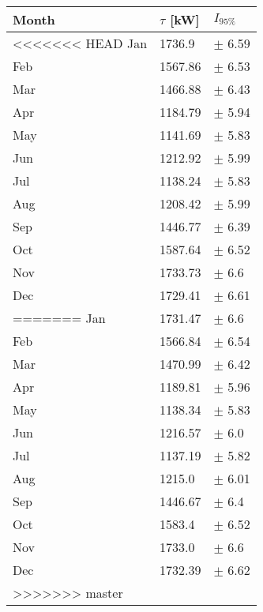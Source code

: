 \begin{tabular}{lll}
\toprule
Month & $\tau$ [kW] &   $I_{95\%}$ \\
\midrule
<<<<<<< HEAD
  Jan &      1736.9 &   $\pm$ 6.59 \\
  Feb &     1567.86 &   $\pm$ 6.53 \\
  Mar &     1466.88 &   $\pm$ 6.43 \\
  Apr &     1184.79 &   $\pm$ 5.94 \\
  May &     1141.69 &   $\pm$ 5.83 \\
  Jun &     1212.92 &   $\pm$ 5.99 \\
  Jul &     1138.24 &   $\pm$ 5.83 \\
  Aug &     1208.42 &   $\pm$ 5.99 \\
  Sep &     1446.77 &   $\pm$ 6.39 \\
  Oct &     1587.64 &   $\pm$ 6.52 \\
  Nov &     1733.73 &    $\pm$ 6.6 \\
  Dec &     1729.41 &   $\pm$ 6.61 \\
=======
  Jan &     1731.47 &    $\pm$ 6.6 \\
  Feb &     1566.84 &   $\pm$ 6.54 \\
  Mar &     1470.99 &   $\pm$ 6.42 \\
  Apr &     1189.81 &   $\pm$ 5.96 \\
  May &     1138.34 &   $\pm$ 5.83 \\
  Jun &     1216.57 &    $\pm$ 6.0 \\
  Jul &     1137.19 &   $\pm$ 5.82 \\
  Aug &      1215.0 &   $\pm$ 6.01 \\
  Sep &     1446.67 &    $\pm$ 6.4 \\
  Oct &      1583.4 &   $\pm$ 6.52 \\
  Nov &      1733.0 &    $\pm$ 6.6 \\
  Dec &     1732.39 &   $\pm$ 6.62 \\
>>>>>>> master
\bottomrule
\end{tabular}
